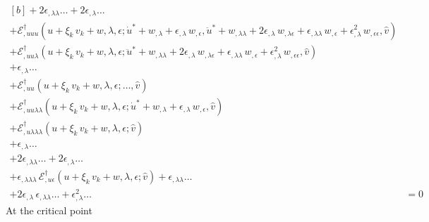 \documentclass[12pt, final]{scrartcl}
\theoremstyle{definition}
\newcommand{\EE}{\mathcal E ^ \dagger}
\begin{document}
\begin{equation}
\begin{aligned}[b]
    + 2\epsilon_{,\lambda\lambda} \ldots + 2\epsilon_{,\lambda} \ldots &\\
    + \EE_{,uuu}(u + \xi_k \, v_k + w, \lambda, \epsilon; \dot{u}^\ast + w_{,\lambda} + \epsilon_{,\lambda} \, w_{,\epsilon}, \ddot{u}^\ast + w_{,\lambda\lambda} + 2\epsilon_{,\lambda} \, w_{,\lambda\epsilon} + \epsilon_{,\lambda\lambda} \, w_{,\epsilon} + \epsilon_{,\lambda}^2 \, w_{,\epsilon\epsilon}, \hat{v}) &\\
    + \EE_{,uu\lambda}(u + \xi_k \, v_k + w, \lambda, \epsilon; \ddot{u}^\ast + w_{,\lambda\lambda} + 2\epsilon_{,\lambda} \, w_{,\lambda\epsilon} + \epsilon_{,\lambda\lambda} \, w_{,\epsilon} + \epsilon_{,\lambda}^2 \, w_{,\epsilon\epsilon}, \hat{v}) &\\
    + \epsilon_{,\lambda} \ldots &\\
     + \EE_{,uu}(u + \xi_k \, v_k + w, \lambda, \epsilon; \ldots, \hat{v}) &\\
    + \EE_{,uu\lambda\lambda}(u + \xi_k \, v_k + w, \lambda, \epsilon; \dot{u}^\ast + w_{,\lambda} + \epsilon_{,\lambda} \, w_{,\epsilon}, \hat{v}) &\\
    + \EE_{,u\lambda\lambda\lambda}(u + \xi_k \, v_k + w, \lambda, \epsilon; \hat{v}) &\\
    + \epsilon_{,\lambda} \ldots &\\
    +2\epsilon_{,\lambda\lambda} \ldots + 2\epsilon_{,\lambda} \ldots &\\
    + \epsilon_{,\lambda\lambda\lambda} \, \EE_{,u\epsilon}(u + \xi_k \, v_k + w, \lambda, \epsilon; \hat{v})
    + \epsilon_{,\lambda\lambda} \ldots &\\
    + 2 \epsilon_{,\lambda} \, \epsilon_{,\lambda\lambda} \ldots
    + \epsilon_{,\lambda}^2 \ldots &= 0
  \end{aligned}
\end{equation}
At the critical point
\end{document}
